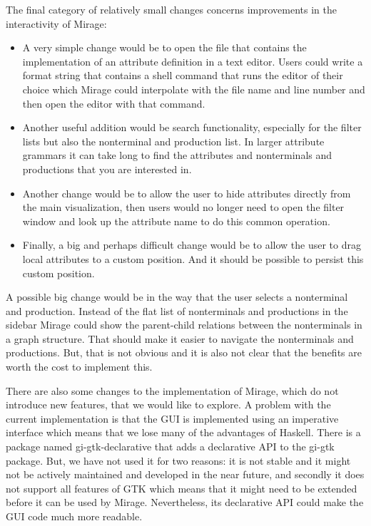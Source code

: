 \documentclass[11pt]{article}
\begin{document}
The final category of relatively small changes concerns improvements in the interactivity of Mirage:
\begin{itemize}
  \item A very simple change would be to open the file that contains the implementation of an attribute definition in a text editor. Users could write a format string that contains a shell command that runs the editor of their choice which Mirage could interpolate with the file name and line number and then open the editor with that command.
  \item Another useful addition would be search functionality, especially for the filter lists but also the nonterminal and production list. In larger attribute grammars it can take long to find the attributes and nonterminals and productions that you are interested in.
  \item Another change would be to allow the user to hide attributes directly from the main visualization, then users would no longer need to open the filter window and look up the attribute name to do this common operation.
  \item Finally, a big and perhaps difficult change would be to allow the user to drag local attributes to a custom position. And it should be possible to persist this custom position.
\end{itemize}

A possible big change would be in the way that the user selects a nonterminal and production. Instead of the flat list of nonterminals and productions in the sidebar Mirage could show the parent-child relations between the nonterminals in a graph structure. That should make it easier to navigate the nonterminals and productions. But, that is not obvious and it is also not clear that the benefits are worth the cost to implement this.

There are also some changes to the implementation of Mirage, which do not introduce new features, that we would like to explore. A problem with the current implementation is that the GUI is implemented using an imperative interface which means that we lose many of the advantages of Haskell. There is a package named gi-gtk-declarative that adds a declarative API to the gi-gtk package. But, we have not used it for two reasons: it is not stable and it might not be actively maintained and developed in the near future, and secondly it does not support all features of GTK which means that it might need to be extended before it can be used by Mirage. Nevertheless, its declarative API could make the GUI code much more readable.
\end{document}
